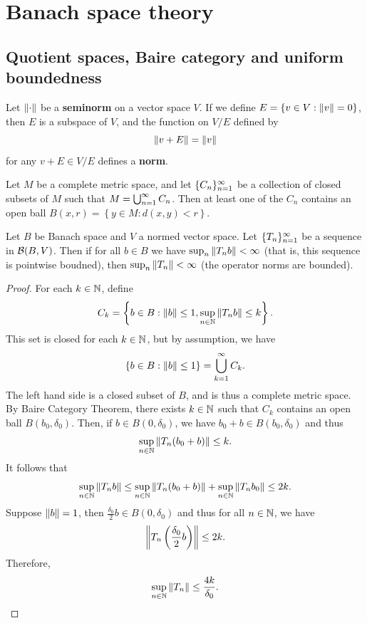 \documentclass[a4paper]{article}
\begin{document}
\maketitle

\tableofcontents

\section{Banach space theory}

\subsection{Quotient spaces, Baire category and
  uniform boundedness}

\begin{thm}
  Let $\left\lVert \cdot\right\rVert$ be a \textbf{seminorm} on a vector
  space $V$. If we define $E = \left\{ v \in V: \left\lVert v\right\rVert
    = 0 \right\}$, then $E$ is a subspace of $V$,
  and the function on $V / E$ defined by
  \[
    \left\lVert v + E\right\rVert = \left\lVert v\right\rVert
  \]
  for any $v + E \in V / E$ defines a \textbf{norm}.
\end{thm}

\begin{thm}
  Let $M$ be a complete metric space, and let $\{ C_n \}_{n=1}^\infty$
  be a collection of closed subsets of $M$ such that
  $M = \bigcup_{n=1}^\infty C_n$. Then at least one of the $C_n$ contains
  an open ball $B(x, r) = \left\{ y \in M : d(x, y) < r \right\}$.
\end{thm}

\begin{thm}
  Let $B$ be Banach space and $V$ a normed vector space.
  Let $\{ T_n \}_{n=1}^\infty$ be a sequence in $\mathcal{B}(B, V)$.
  Then if for all $b \in B$ we have $\sup_n \left\lVert T_n b\right\rVert < \infty$
  (that is, this sequence is pointwise boudned),
  then $\sup_n \left\lVert T_n\right\rVert < \infty$ (the operator norms are
  bounded).
\end{thm}

\begin{proof}
  For each $k \in \mathbb{N}$, define
  \[
    C_k = \left\{ b \in B: \left\lVert b\right\rVert \leq 1, \sup_{n \in \mathbb{N}}
    \left\lVert T_n b\right\rVert \leq k \right\}.
  \]
  This set is closed for each $k \in \mathbb{N}$, but by assumption,
  we have
  \[
    \left\{ b \in B: \left\lVert b\right\rVert \leq 1 \right\} = \bigcup_{k=1}^\infty C_k.
  \]
  The left hand side is a closed subset of $B$, and is thus
  a complete metric space. By Baire Category Theorem,
  there exists $k \in \mathbb{N}$ such that $C_k$ contains an open
  ball $B(b_0, \delta_0)$. Then, if $b \in B(0, \delta_0)$,
  we have $b_0 + b \in B(b_0, \delta_0)$ and thus
  \[
    \sup_{n \in \mathbb{N}} \left\lVert T_n (b_0 + b)\right\rVert \leq k.
  \]
  It follows that
  \[
    \sup_{n \in \mathbb{N}} \left\lVert T_n b\right\rVert \leq \sup_{n \in \mathbb{N}}
    \left\lVert T_n (b_0 + b)\right\rVert + \sup_{n \in \mathbb{N}} \left\lVert T_n b_0\right\rVert
    \leq 2k.
  \]
  Suppose $\left\lVert b\right\rVert = 1$, then $\frac{\delta_0}{2} b \in
    B(0, \delta_0)$ and thus for all $n \in \mathbb{N}$,
  we have
  \[
    \left\lVert T_n \left( \frac{\delta_0}{2} b \right)\right\rVert \leq 2k.
  \]
  Therefore,
  \[
    \sup_{n \in \mathbb{N}} \left\lVert T_n\right\rVert \leq \frac{4k}{\delta_0}.
  \]
\end{proof}
\end{document}

